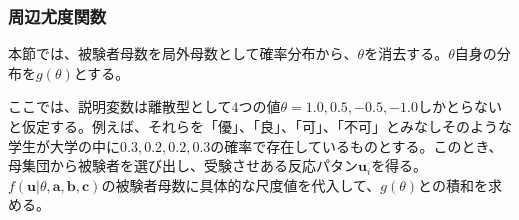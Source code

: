 \documentclass[12pt]{jarticle}
\begin{document}
\subsubsection{周辺尤度関数}
本節では、被験者母数を局外母数として確率分布から、$\displaystyle\theta$を消去する。$\displaystyle\theta$自身の分布を$\displaystyle g(\theta)$とする。

ここでは、説明変数は離散型として$4$つの値$\displaystyle \theta = 1.0,0.5,-0.5,-1.0$しかとらないと仮定する。例えば、それらを「優」、「良」、「可」、「不可」とみなしそのような学生が大学の中に$0.3,0.2,0.2,0.3$の確率で存在しているものとする。このとき、母集団から被験者を選び出し、受験させある反応パタン$\boldsymbol{u}_i$を得る。$f(\boldsymbol{u}|\theta,
\boldsymbol{a,b,c})$の被験者母数に具体的な尺度値を代入して、$g(\theta)$との積和を求める。
\end{document}
